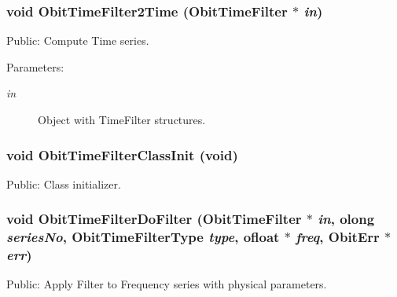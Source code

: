\subsubsection{\setlength{\rightskip}{0pt plus 5cm}void Obit\-Time\-Filter2Time ({\bf Obit\-Time\-Filter} $\ast$ {\em in})}\label{ObitTimeFilter_8h_a23}


Public: Compute Time series. 

\begin{Desc}
\item[Parameters:]
\begin{description}
\item[{\em in}]Object with Time\-Filter structures. \end{description}
\end{Desc}
\subsubsection{\setlength{\rightskip}{0pt plus 5cm}void Obit\-Time\-Filter\-Class\-Init (void)}\label{ObitTimeFilter_8h_a16}


Public: Class initializer. 

\subsubsection{\setlength{\rightskip}{0pt plus 5cm}void Obit\-Time\-Filter\-Do\-Filter ({\bf Obit\-Time\-Filter} $\ast$ {\em in}, {\bf olong} {\em series\-No}, Obit\-Time\-Filter\-Type {\em type}, {\bf ofloat} $\ast$ {\em freq}, {\bf Obit\-Err} $\ast$ {\em err})}\label{ObitTimeFilter_8h_a25}


Public: Apply Filter to Frequency series with physical parameters. 

